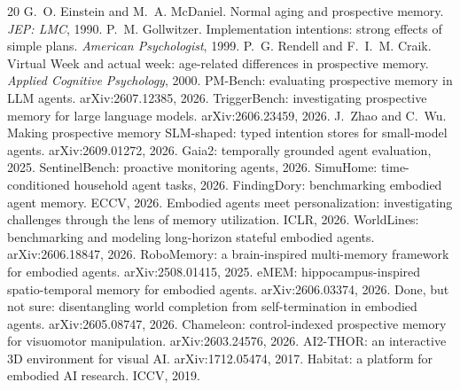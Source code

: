 \documentclass[10pt]{article}
\begin{document}

\begin{thebibliography}{20}\small
{} G.~O. Einstein and M.~A.
McDaniel. Normal aging and prospective memory. \emph{JEP: LMC}, 1990.
 P.~M. Gollwitzer. Implementation
intentions: strong effects of simple plans. \emph{American Psychologist}, 1999.
 P.~G. Rendell and F.~I.~M. Craik.
Virtual Week and actual week: age-related differences in prospective memory.
\emph{Applied Cognitive Psychology}, 2000.
 PM-Bench: evaluating prospective memory in
LLM agents. arXiv:2607.12385, 2026.
 TriggerBench: investigating
prospective memory for large language models. arXiv:2606.23459, 2026.
 J.~Zhao and C.~Wu. Making prospective
memory SLM-shaped: typed intention stores for small-model agents.
arXiv:2609.01272, 2026.
 Gaia2: temporally grounded agent evaluation, 2025.
 SentinelBench: proactive monitoring
agents, 2026.
 SimuHome: time-conditioned household agent
tasks, 2026.
 FindingDory: benchmarking embodied
agent memory. ECCV, 2026.
 Embodied agents meet personalization:
investigating challenges through the lens of memory utilization. ICLR, 2026.
 WorldLines: benchmarking and modeling
long-horizon stateful embodied agents. arXiv:2606.18847, 2026.
 RoboMemory: a brain-inspired multi-memory
framework for embodied agents. arXiv:2508.01415, 2025.
 eMEM: hippocampus-inspired spatio-temporal memory
for embodied agents. arXiv:2606.03374, 2026.
 Done, but not sure: disentangling world completion
from self-termination in embodied agents. arXiv:2605.08747, 2026.
 Chameleon: control-indexed prospective
memory for visuomotor manipulation. arXiv:2603.24576, 2026.
 AI2-THOR: an interactive 3D environment for
visual AI. arXiv:1712.05474, 2017.
 Habitat: a platform for embodied AI research.
ICCV, 2019.
\end{thebibliography}
\end{document}
